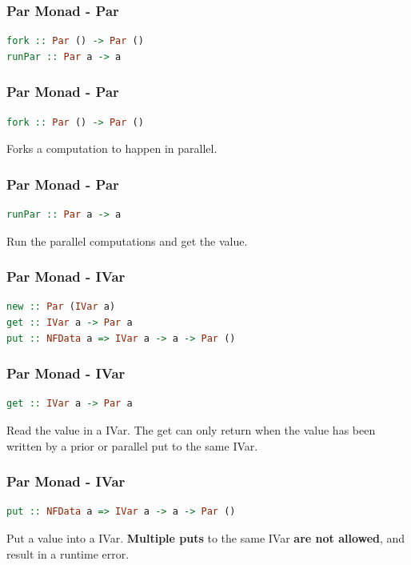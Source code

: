 \documentclass[12pt, danish]{beamer}
\begin{document}
\begin{frame}[fragile]
  \frametitle{Par Monad - Par}
  \begin{lstlisting}[language=Haskell]
fork :: Par () -> Par ()
runPar :: Par a -> a
  \end{lstlisting}
\end{frame}

\begin{frame}[fragile]
  \frametitle{Par Monad - Par}
  \begin{lstlisting}[language=Haskell]
fork :: Par () -> Par ()
  \end{lstlisting}

  Forks a computation to happen in parallel.
\end{frame}

\begin{frame}[fragile]
  \frametitle{Par Monad - Par}
  \begin{lstlisting}[language=Haskell]
runPar :: Par a -> a
  \end{lstlisting}

  Run the parallel computations and get the value.
\end{frame}

\begin{frame}[fragile]
  \frametitle{Par Monad - IVar}
  \begin{lstlisting}[language=Haskell]
new :: Par (IVar a)
get :: IVar a -> Par a
put :: NFData a => IVar a -> a -> Par ()
  \end{lstlisting}
\end{frame}

\begin{frame}[fragile]
  \frametitle{Par Monad - IVar}
  \begin{lstlisting}[language=Haskell]
get :: IVar a -> Par a  
  \end{lstlisting}

  Read the value in a IVar. The get can only return when the value 
  has been written by a prior or parallel put to the same IVar.
  
\end{frame}

\begin{frame}[fragile]
  \frametitle{Par Monad - IVar}
  \begin{lstlisting}[language=Haskell]
put :: NFData a => IVar a -> a -> Par ()
  \end{lstlisting} 
    
  Put a value into a IVar. \textbf{Multiple puts} to the same IVar \textbf{are not 
    allowed}, and result in a runtime error.
    
\end{frame}
\end{document}
